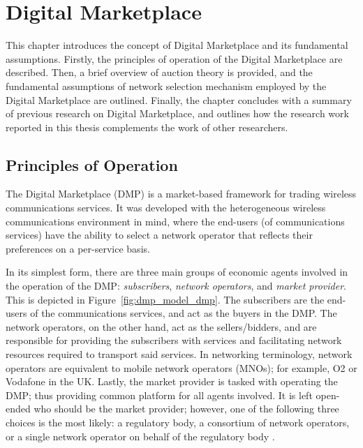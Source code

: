 \chapter{Digital Marketplace} %
\label{cha:dmp}

\minitoc
\vspace{10mm}

This chapter introduces the concept of Digital Marketplace and its fundamental assumptions. Firstly, the principles of operation of the Digital Marketplace are described. Then, a brief overview of auction theory is provided, and the fundamental assumptions of network selection mechanism employed by the Digital Marketplace are outlined. Finally, the chapter concludes with a summary of previous research on Digital Marketplace, and outlines how the research work reported in this thesis complements the work of other researchers.

\section{Principles of Operation} %
\label{sec:principles_of_operation_dmp}
The Digital Marketplace (DMP) is a market-based framework for trading wireless communications services. It was developed with the heterogeneous wireless communications environment in mind, where the end-users (of communications services) have the ability to select a network operator that reflects their preferences on a per-service basis.

In its simplest form, there are three main groups of economic agents involved in the operation of the DMP: \emph{subscribers}, \emph{network operators}, and \emph{market provider}. This is depicted in Figure~\ref{fig:dmp_model_dmp}. The subscribers are the end-users of the communications services, and act as the buyers in the DMP. The network operators, on the other hand, act as the sellers/bidders, and are responsible for providing the subscribers with services and facilitating network resources required to transport said services. In networking terminology, network operators are equivalent to mobile network operators (MNOs); for example, O2 or Vodafone in the UK. Lastly, the market provider is tasked with operating the DMP; thus providing common platform for all agents involved. It is left open-ended who should be the market provider; however, one of the following three choices is the most likely: a regulatory body, a consortium of network operators, or a single network operator on behalf of the regulatory body \cite{DMLeBodic00,DMIrvine02}.


